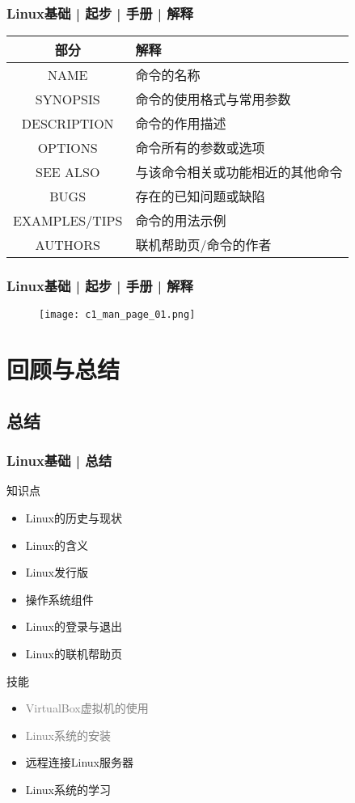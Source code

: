 \begin{frame}
  \frametitle{Linux基础 | 起步 | 手册 | 解释}
  \begin{table}
    \centering
    \begin{tabular}{cl}
      \hline
      \rowcolor{blue!50}部分 & 解释\\
      \hline
      NAME & 命令的名称\\
      SYNOPSIS & 命令的使用格式与常用参数\\
      DESCRIPTION & 命令的作用描述\\
      OPTIONS & 命令所有的参数或选项\\
      SEE ALSO & 与该命令相关或功能相近的其他命令\\
      BUGS & 存在的已知问题或缺陷\\
      EXAMPLES/TIPS & 命令的用法示例\\
      AUTHORS & 联机帮助页/命令的作者\\
      \hline
    \end{tabular}
  \end{table}
\end{frame}

\begin{frame}
  \frametitle{Linux基础 | 起步 | 手册 | 解释}
  \begin{figure}
    \centering
    \texttt{[image: c1\_man\_page\_01.png]}
  \end{figure}
\end{frame}

\section{回顾与总结}
\subsection{总结}
\begin{frame}
  \frametitle{Linux基础 | 总结}
  \begin{block}{知识点}
    \begin{itemize}
      \item Linux的历史与现状
      \item Linux的含义
      \item Linux发行版
      \item 操作系统组件
      \item Linux的登录与退出
      \item Linux的联机帮助页
    \end{itemize}
  \end{block}
  \begin{block}{技能}
    \begin{itemize}
      \item \textcolor{gray}{VirtualBox虚拟机的使用}
      \item \textcolor{gray}{Linux系统的安装}
      \item 远程连接Linux服务器
      \item Linux系统的学习
    \end{itemize}
  \end{block}
\end{frame}

